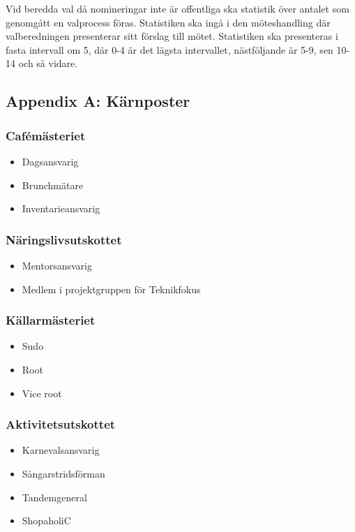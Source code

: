 \documentclass{dsekprotokoll}
\begin{document}
Vid beredda val då nomineringar inte är offentliga ska statistik över antalet som genomgått en valprocess föras. Statistiken ska ingå i den möteshandling där valberedningen presenterar sitt förslag till mötet. Statistiken ska presenteras i fasta intervall om 5, där 0-4
är det lägsta intervallet, nästföljande är 5-9, sen 10-14 och så
vidare.

\pagebreak
\subsection*{Appendix A: Kärnposter}
\begin{multicols}{2}

    \subsubsection*{Cafémästeriet}
    \begin{itemize}
        \item Dagsansvarig
        \item Brunchmätare
        \item Inventarieansvarig
    \end{itemize}

    \subsubsection*{Näringslivsutskottet}
    \begin{itemize}
        \item Mentorsansvarig
        \item Medlem i projektgruppen för Teknikfokus
    \end{itemize}

    \subsubsection*{Källarmästeriet}
    \begin{itemize}
        \item Sudo
        \item Root
        \item Vice root
    \end{itemize}

    \subsubsection*{Aktivitetsutskottet}
    \begin{itemize}
        \item Karnevalsansvarig
        \item Sångarstridsförman
        \item Tandemgeneral
        \item ShopaholiC
    \end{itemize}


\end{multicols}
\end{document}
